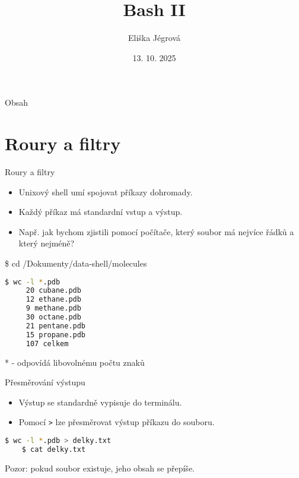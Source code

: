 \documentclass{beamer}
\title{Bash II}
\author{Eliška Jégrová}
\date{13. 10. 2025}
\newcommand{\ts}{\raisebox{-0.25em}{\textasciitilde}}
\begin{document}
	
	\frame{\titlepage}
	
	\begin{frame}{Obsah}
		\tableofcontents
	\end{frame}
	
\section{Roury a filtry}

\begin{frame}[fragile]{Roury a filtry}
	\begin{itemize}
		\item Unixový shell umí spojovat příkazy dohromady.
		\item Každý příkaz má standardní vstup a výstup.
		\item Např. jak bychom zjistili pomocí počítače, který soubor má nejvíce řádků a který nejméně?
	\end{itemize}
	\vspace{0.5em}
	\hspace{4.85em}\$ cd \texttt{\ts}/Dokumenty/data-shell/molecules
	\begin{lstlisting}[language=bash]
	$ wc -l *.pdb
	 20 cubane.pdb
	 12 ethane.pdb
  	 9 methane.pdb
	 30 octane.pdb
	 21 pentane.pdb
	 15 propane.pdb
	 107 celkem
	\end{lstlisting}
		* - odpovídá libovolnému počtu znaků
\end{frame}

\begin{frame}[fragile]{Přesměrování výstupu}
	\begin{itemize}
		\item Výstup se standardně vypisuje do terminálu.
	\end{itemize}
	\begin{center}
		
	\end{center}
	\begin{itemize}
		\item Pomocí \texttt{>} lze přesměrovat výstup příkazu do souboru.
	\end{itemize}
	    \begin{center}
		
	\end{center}
	\begin{lstlisting}[language=bash]
	$ wc -l *.pdb > delky.txt
	$ cat delky.txt
	\end{lstlisting}
	Pozor: pokud soubor existuje, jeho obsah se přepíše.
\end{frame}
\end{document}
